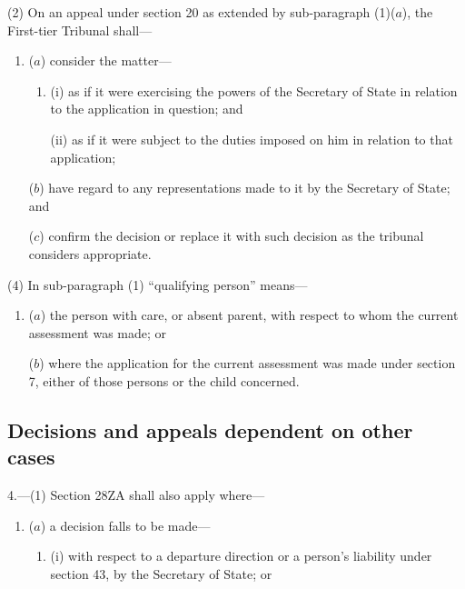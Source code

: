 \documentclass[12pt,a4paper]{article}
\begin{document}
{(2) On an appeal under section 20 as extended by sub-paragraph (1)($a$), the First-tier Tribunal shall---
\begin{enumerate}\item[]
($a$) consider the matter---
\begin{enumerate}\item[]
(i) as if it were exercising the powers of the Secretary of State in relation to the application in question; and

(ii) as if it were subject to the duties imposed on him in relation to that application;
\end{enumerate}

($b$) have regard to any representations made to it by the Secretary of State; and

($c$) confirm the decision or replace it with such decision as the tribunal considers appropriate.
\end{enumerate}


(4) In sub-paragraph (1) “qualifying person” means---
\begin{enumerate}\item[]
($a$) the person with care, or absent parent, with respect to whom the current assessment was made; or

($b$) where the application for the current assessment was made under section 7, either of those persons or the child concerned.
\end{enumerate}


\subsection*{Decisions and appeals dependent on other cases}

4.---(1) Section 28ZA shall also apply where---
\begin{enumerate}\item[]
($a$) a decision falls to be made—
\begin{enumerate}\item[]
(i) with respect to a departure direction
 or a person’s liability under section 43, by the Secretary of State; or


\end{enumerate}
\end{enumerate}}
\end{document}
